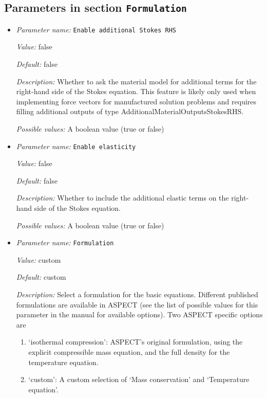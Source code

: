 \subsection{Parameters in section \tt Formulation}
\label{parameters:Formulation}

\begin{itemize}
\item {\it Parameter name:} {\tt Enable additional Stokes RHS}
\label{parameters:Formulation/Enable additional Stokes RHS}


{\it Value:} false


{\it Default:} false


{\it Description:} Whether to ask the material model for additional terms for the right-hand side of the Stokes equation. This feature is likely only used when implementing force vectors for manufactured solution problems and requires filling additional outputs of type AdditionalMaterialOutputsStokesRHS.


{\it Possible values:} A boolean value (true or false)
\item {\it Parameter name:} {\tt Enable elasticity}
\label{parameters:Formulation/Enable elasticity}


{\it Value:} false


{\it Default:} false


{\it Description:} Whether to include the additional elastic terms on the right-hand side of the Stokes equation.


{\it Possible values:} A boolean value (true or false)
\item {\it Parameter name:} {\tt Formulation}
\label{parameters:Formulation/Formulation}


{\it Value:} custom


{\it Default:} custom


{\it Description:} Select a formulation for the basic equations. Different published formulations are available in ASPECT (see the list of possible values for this parameter in the manual for available options). Two ASPECT specific options are
\begin{enumerate}
  \item `isothermal compression': ASPECT's original formulation, using the explicit compressible mass equation, and the full density for the temperature equation.
  \item `custom': A custom selection of `Mass conservation' and `Temperature equation'.
\end{enumerate}


\end{itemize}

